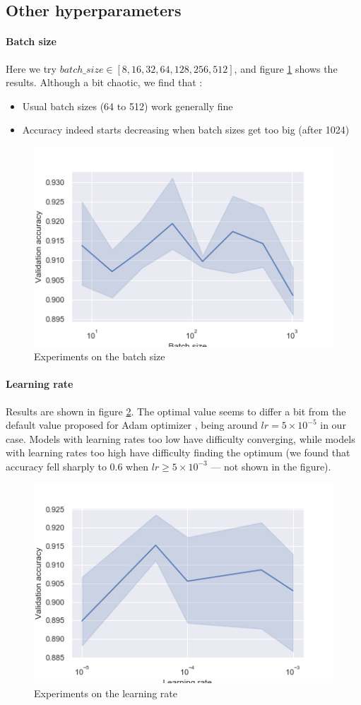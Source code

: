 \documentclass{article}
\begin{document}
\subsection{Other hyperparameters}
\paragraph{Batch size}
Here we try $batch\_size \in [8, 16, 32, 64, 128, 256, 512]$, and figure \ref{fig:batch-size} shows the results. Although a bit chaotic, we find that :
\begin{itemize}
    \item Usual batch sizes (64 to 512) work generally fine
    \item Accuracy indeed starts decreasing when batch sizes get too big (after 1024)
\end{itemize}
\begin{figure}
    \centering
    \includegraphics[width=0.6\linewidth]{img/batch_size.png}
    \caption{Experiments on the batch size}
    \label{fig:batch-size}
\end{figure}

\paragraph{Learning rate}
Results are shown in figure \ref{fig:learning-rate}. The optimal value seems to differ a bit from the default value proposed for Adam optimizer \cite{kingma2014adam}, being around $lr=5\times10^{-5}$ in our case. Models with learning rates too low have difficulty converging, while models with learning rates too high have difficulty finding the optimum (we found that accuracy fell sharply to $0.6$ when $lr\geq5\times10^{-3}$ — not shown in the figure).
\begin{figure}
    \centering
    \includegraphics[width=0.6\linewidth]{img/learning_rate.png}
    \caption{Experiments on the learning rate}
    \label{fig:learning-rate}
\end{figure}
\end{document}
